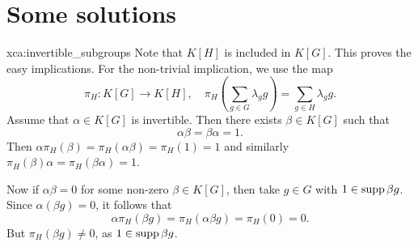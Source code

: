 \chapter*{Some solutions}



\begin{sol}{xca:invertible_subgroups}
Note that $K[H]$ is included in $K[G]$. This proves the easy implications. For the non-trivial implication, we use the map 
\[ 
\pi_H\colon K[G]\to K[H],\quad \pi_H\left(\sum_{g\in G}\lambda_gg\right)=\sum_{g\in H}\lambda_gg.
\] 
Assume that $\alpha\in K[G]$ is invertible. Then there exists $\beta\in K[G]$ such that \[ 
\alpha\beta=\beta\alpha=1.
\]
Then $\alpha\pi_H(\beta)=\pi_H(\alpha\beta)=\pi_H(1)=1$ and similarly $\pi_H(\beta)\alpha=\pi_H(\beta\alpha)=1$. 

Now if $\alpha\beta=0$ for some non-zero $\beta\in K[G]$, then take $g\in G$ with $1\in\operatorname{supp} \beta g$. Since $\alpha(\beta g)=0$, it follows that 
\[ 
\alpha\pi_H(\beta g)=\pi_H(\alpha\beta g)=\pi_H(0)=0. 
\]
But $\pi_H(\beta g)\ne 0$, as $1\in\operatorname{supp}\beta g$. 
\end{sol}

